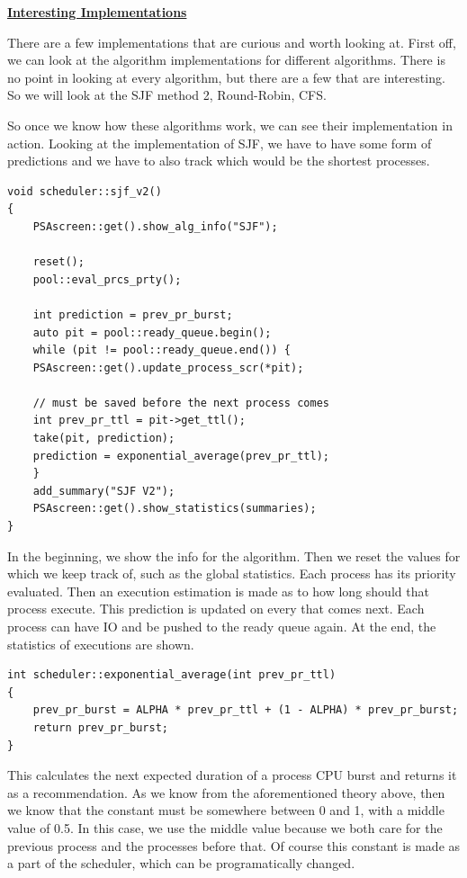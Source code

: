 \documentclass{article}
\newcommand{\code}[1]{\codeinline{\texttt{#1}}}
\begin{document}
\bigskip

\textbf{\underline{Interesting Implementations}}

There are a few implementations that are curious and worth looking at. First off, we can look at the algorithm implementations for different algorithms. There is no point in looking at every algorithm, but there are a few that are interesting. So we will look at the SJF method 2, Round-Robin, CFS.

So once we know how these algorithms work, we can see their implementation in action. Looking at the implementation of SJF, we have to have some form of predictions and we have to also track which would be the shortest processes.

\begin{lstlisting}
void scheduler::sjf_v2()
{
    PSAscreen::get().show_alg_info("SJF");

    reset();
    pool::eval_prcs_prty();

    int prediction = prev_pr_burst;
    auto pit = pool::ready_queue.begin();
    while (pit != pool::ready_queue.end()) {
	PSAscreen::get().update_process_scr(*pit);

	// must be saved before the next process comes
	int prev_pr_ttl = pit->get_ttl();
	take(pit, prediction);
	prediction = exponential_average(prev_pr_ttl);
    }
    add_summary("SJF V2");
    PSAscreen::get().show_statistics(summaries);
}
\end{lstlisting}

In the beginning, we show the info for the algorithm. Then we reset the values for which we keep track of, such as the global statistics. Each process has its priority evaluated. Then an execution estimation is made as to how long should that process execute. This prediction is updated on every that comes next. Each process can have IO and be pushed to the ready queue again. At the end, the statistics of executions are shown.

\begin{lstlisting}
int scheduler::exponential_average(int prev_pr_ttl)
{
    prev_pr_burst = ALPHA * prev_pr_ttl + (1 - ALPHA) * prev_pr_burst;
    return prev_pr_burst;
}
\end{lstlisting}

This calculates the next expected duration of a process CPU burst and returns it as a recommendation. As we know from the aforementioned theory above, then we know that the constant \code{ALPHA} must be somewhere between 0 and 1, with a middle value of 0.5. In this case, we use the middle value because we both care for the previous process and the processes before that. Of course this constant is made as a part of the scheduler, which can be programatically changed.
\end{document}
